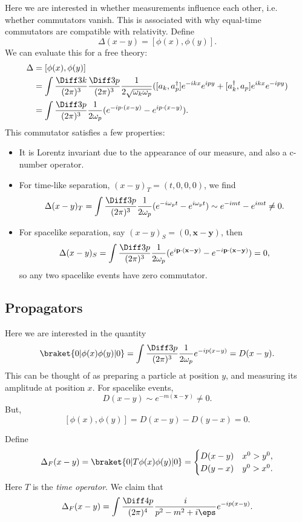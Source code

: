 \documentclass[12pt]{article}
\begin{document}
Here we are interested in whether measurements influence each other, i.e. whether commutators vanish. This is associated with why equal-time commutators are compatible with relativity. Define
\[
	\Delta(x - y) = [\phi(x), \phi(y)].
\]
We can evaluate this for a free theory:
\begin{align*}
	\Delta &= [\phi(x), \phi(y)] \\
	       &= \int \frac{\Diff3k}{(2\pi)^3} \frac{\Diff3p}{(2\pi)^3}\frac{1}{2\sqrt{\omega_k\omega_p}}([a_k, a_p^\dagger] e^{-ikx} e^{ipy} + [a_k^\dagger, a_p] e^{ikx} e^{-ipy} ) \\
	       &= \int \frac{\Diff 3 p}{(2 \pi)^3} \frac{1}{2\omega_p} (e^{-ip\cdot(x - y)} - e^{ip\cdot(x-y)}).
\end{align*}
This commutator satisfies a few properties:
\begin{itemize}
	\item It is Lorentz invariant due to the appearance of our measure, and also a c-number operator.
	\item For time-like separation, $(x-y)_T = (t, 0, 0, 0)$, we find
		\[
		\Delta(x - y)_T = \int \frac{\Diff3p}{(2\pi)^3} \frac{1}{2\omega_p}(e^{-i\omega_pt}-e^{i\omega_pt}) \sim e^{-imt}-e^{imt}\neq 0.
		\]
	\item For spacelike separation, say $(x-y)_S = (0, \mathbf{x} - \mathbf{y})$, then
		\[
		\Delta(x - y)_S = \int\frac{\Diff3p}{(2\pi)^3}\frac{1}{2\omega_p}(e^{i\mathbf{p}\cdot(\mathbf{x}-\mathbf{y})}-e^{-i\mathbf{p}\cdot(\mathbf{x}-\mathbf{y})})=0,
		\]
		so any two spacelike events have zero commutator.
\end{itemize}

\subsection{Propagators}%
\label{sub:props}

Here we are interested in the quantity
\[
	\braket{0|\phi(x)\phi(y)|0} = \int \frac{\Diff3p}{(2\pi)^3} \frac{1}{2\omega_p} e^{-ip(x-y)} = D(x-y).
\]
This can be thought of as preparing a particle at position $y$, and measuring its amplitude at position $x$. For spacelike events,
\[
D(x-y) \sim e^{-m(\mathbf{x}-\mathbf{y})} \neq 0.
\]
But,
\[
	[\phi(x),\phi(y)]=D(x-y)-D(y-x)=0.
\]


Define
\[
	\Delta_F(x - y) = \braket{0|T \phi(x) \phi(y)|0}=
	\begin{cases}
		D(x - y) & x^0 > y^0, \\
		D(y - x) & y^0 > x^0.
	\end{cases}
\]
Here $T$ is the \emph{time operator}. We claim that
\[
\Delta_F(x - y) = \int \frac{\Diff 4 p}{(2 \pi)^4} \frac{i}{p^2 - m^2 + i \eps} e^{-ip(x - y)}.
\]
\end{document}
